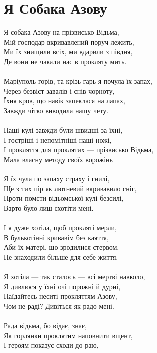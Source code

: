 \section{Я Собака Азову}

Я собака Азову на прізвисько Відьма,\\
Мій господар вкривавлений поруч лежить,\\
Ми їх знищили всіх, ми вдарили з півдня,\\
Де вони не чакали нас в прокляту мить.
\\
\\
Маріуполь горів, та крізь гарь я почула їх запах,\\
Через безвіст завалів і снів чорноту,\\
Їхня кров, що навік запеклася на лапах,\\
Завжди чітко виводила нашу чету.
\\
\\
Наші кулі завжди були швидші за їхні,\\
І гостріші і непомітніші наші ножі,\\
І прокляття для проклятих --- прізвисько Відьма,\\
Мала власну методу своїх ворожінь
\\
\\
Я їх чула по запаху страху і гнилі,\\
Ще з тих пір як лютневий вкривавило сніг,\\
Проти помсти відьомської кулі безсилі,\\
Варто було лиш схотіти мені.
\\
\\
І я дуже хотіла, щоб прокляті мерли,\\
В булькотінні кривавім без каяття,\\
Аби їх матері, що зродилися стервом,\\
Не знаходили більше для себе життя.
\\
\\
Я хотіла --- так сталось --- всі мертві навколо,\\
Я дивлюся у їхні очі порожні й дурні,\\
Наїдайтесь неситі прокляттям Азову,\\
Чом не раді? Дивіться як радо мені.
\\
\\
Рада відьма, бо відає, знає,\\
Як горлянки проклятим наповнити вщент,\\
І героям показує сходи до раю,\\
